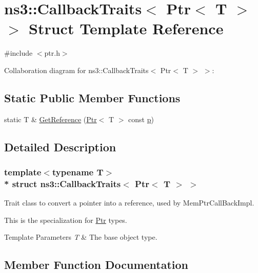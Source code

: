 \hypertarget{structns3_1_1CallbackTraits_3_01Ptr_3_01T_01_4_01_4}{}\section{ns3\+:\+:Callback\+Traits$<$ Ptr$<$ T $>$ $>$ Struct Template Reference}
\label{structns3_1_1CallbackTraits_3_01Ptr_3_01T_01_4_01_4}


{\ttfamily \#include $<$ptr.\+h$>$}



Collaboration diagram for ns3\+:\+:Callback\+Traits$<$ Ptr$<$ T $>$ $>$\+:
\subsection*{Static Public Member Functions}
\begin{DoxyCompactItemize}
\item 
static T \& \hyperlink{structns3_1_1CallbackTraits_3_01Ptr_3_01T_01_4_01_4_acf4b6194cdff450d46b1f83b89ddae93}{Get\+Reference} (\hyperlink{classns3_1_1Ptr}{Ptr}$<$ T $>$ const \hyperlink{lte__link__budget__x2__handover__measures_8m_ac9de518908a968428863f829398a4e62}{p})
\end{DoxyCompactItemize}


\subsection{Detailed Description}
\subsubsection*{template$<$typename T$>$\\*
struct ns3\+::\+Callback\+Traits$<$ Ptr$<$ T $>$ $>$}

Trait class to convert a pointer into a reference, used by Mem\+Ptr\+Call\+Back\+Impl.

This is the specialization for \hyperlink{classns3_1_1Ptr}{Ptr} types.


\begin{DoxyTemplParams}{Template Parameters}
{\em T} & The base object type. \\
\hline
\end{DoxyTemplParams}


\subsection{Member Function Documentation}
